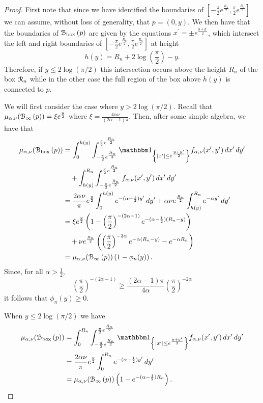 \begin{proof}
First note that since we have identified the boundaries of $[-\frac{\pi}{2}e^{\frac{R_n}{2}}, \frac{\pi}{2}e^{\frac{R_n}{2}}]$ we can assume, without loss of generality, that $p = (0,y)$. We then have that the boundaries of ${\mathcal B}_{\text{box}}\left(p\right)$ are given by the equations $x^\prime = \pm e^{\frac{y+y^\prime}{2}}$, which intersect the left and right boundaries of $[-\frac{\pi}{2}e^{\frac{R_n}{2}}, \frac{\pi}{2}e^{\frac{R_n}{2}}]$ at height
\[
	h(y) = R_n + 2 \log\left(\frac{\pi}{2}\right) - y.
\]
Therefore, if $y \le 2 \log(\pi/2)$ this intersection occurs above the height $R_n$ of the box ${\mathcal R}_n$ while in the other case the full region of the box above $h(y)$ is connected to $p$. 

We will first consider the case where $y > 2 \log(\pi/2)$. Recall that $\mu_{\alpha,\nu}({\mathcal B}_{\infty}\left(p\right)) = \xi e^{\frac{y}{2}}$ where $\xi = \frac{4\alpha \nu}{(2\alpha - 1)\pi}$. Then, after some simple algebra, we have that
\begin{align*}
	\mu_{\alpha,\nu}(\BallPon{p})
	&= \int_0^{h(y)} \int_{-\frac{\pi}{2}e^{\frac{R_n}{2}}}^{\frac{\pi}{2}e^{\frac{R_n}{2}}} 
		\ind{|x^\prime| \le e^{\frac{y+y^\prime}{2}}} f_{\alpha,\nu}(x^\prime,y^\prime) \, dx^\prime \, dy^\prime\\
	&\hspace{10pt}+ \int_{h(y)}^{R_n} \int_{-\frac{\pi}{2}e^{\frac{R_n}{2}}}^{\frac{\pi}{2}e^{\frac{R_n}{2}}} 
		f_{\alpha,\nu}(x^\prime,y^\prime) \, dx^\prime \, dy^\prime\\
	&= \frac{2 \alpha \nu}{\pi} e^{\frac{y}{2}} \int_0^{h(y)} e^{-(\alpha - \frac{1}{2})y^\prime} \, dy^\prime
		+ \alpha \nu e^{\frac{R_n}{2}} \int_{h(y)}^{R_n} e^{-\alpha y^\prime} \, dy^\prime \\
	&= \xi e^{\frac{y}{2}}\left(1 - \left(\frac{\pi}{2}\right)^{-(2\alpha - 1)} 
		e^{-(\alpha - \frac{1}{2})(R_n - y)}\right)\\
	&\hspace{10pt}+ \nu e^{\frac{R_n}{2}}\left(\left(\frac{\pi}{2}\right)^{-2\alpha} e^{-\alpha(R_n - y)} 
		- e^{-\alpha R_n}\right)\\
	&= \mu_{\alpha,\nu}(\BallPo{p})\left(1 - \phi_n(y)\right).
\end{align*}
Since, for all $\alpha > \frac{1}{2}$,
\[
	\left(\frac{\pi}{2}\right)^{-(2\alpha - 1)} \ge \frac{(2\alpha - 1)\pi}{4\alpha} \left(\frac{\pi}{2}\right)^{-2\alpha}
\]
it follows that $\phi_n(y) \ge 0$.

When $y \le 2 \log(\pi/2)$ we have
\begin{align*}
	\mu_{\alpha,\nu}(\BallPon{p})
	&= \int_0^{R_n} \int_{-\frac{\pi}{2}e^{\frac{R_n}{2}}}^{\frac{\pi}{2}e^{\frac{R_n}{2}}} 
		\ind{|x^\prime| \le e^{\frac{y+y^\prime}{2}}} f_{\alpha,\nu}(x^\prime,y^\prime) \, dx^\prime \, dy^\prime\\
	&= \frac{2 \alpha \nu}{\pi} e^{\frac{y}{2}} \int_0^{R_n} e^{-(\alpha - \frac{1}{2})y^\prime} \, dy^\prime\\
	&= \mu_{\alpha,\nu}(\BallPo{p})\left(1 - e^{-(\alpha - \frac{1}{2})R_n}\right).
\end{align*}
\end{proof}

